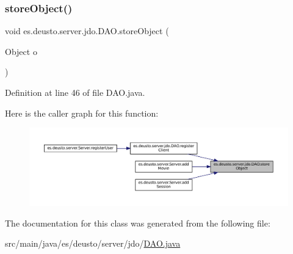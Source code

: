 \subsubsection{\texorpdfstring{storeObject()}{storeObject()}}
{\footnotesize\ttfamily void es.\+deusto.\+server.\+jdo.\+D\+A\+O.\+store\+Object (\begin{DoxyParamCaption}\item[{Object}]{o }\end{DoxyParamCaption})}



Definition at line 46 of file D\+A\+O.\+java.

Here is the caller graph for this function\+:
\nopagebreak
\begin{figure}[H]
\begin{center}
\leavevmode
\includegraphics[width=350pt]{classes_1_1deusto_1_1server_1_1jdo_1_1_d_a_o_a663255898c034b46536c8a9cd2b247f9_icgraph}
\end{center}
\end{figure}


The documentation for this class was generated from the following file\+:\begin{DoxyCompactItemize}
\item 
src/main/java/es/deusto/server/jdo/\mbox{\hyperlink{_d_a_o_8java}{D\+A\+O.\+java}}\end{DoxyCompactItemize}
